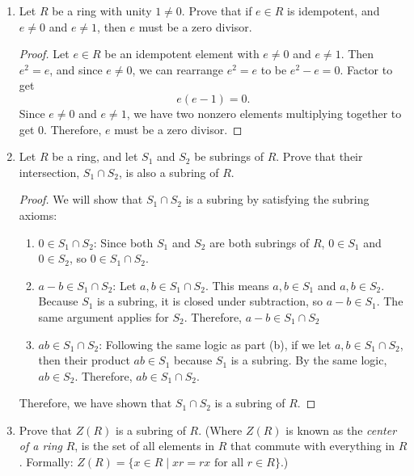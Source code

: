 \documentclass[12pt, oneside]{book}
\newcommand{\pf}[1]{
    \begin{customframedproof}[linecolor=orangehdx!75]
        \begin{proof}
        #1
        \end{proof}
    \end{customframedproof}
}
\begin{document}
\begin{enumerate}
{        \[
            u \cdot a \cdot a^{n - 1} = u \cdot 0.
        \]
        Since \(ua = 1\), we get \(1 \cdot a^{n - 1} = 0\), which means \(a^{n - 1} = 0\). But we said that \(n\) was the smallest such \(n\) such that \(a^{n} = 0\). This is a contradiction. Therefore, \(a\) cannot be a unit.    
    }
    \item Let \(R\) be a ring with unity \(1 \ne 0\). Prove that if \(e \in R\) is idempotent, and \(e \ne 0\) and \(e \ne 1\), then \(e\) must be a zero divisor. 
    \pf{
        Let \(e \in R\) be an idempotent element with \(e \ne 0\) and \(e \ne 1\). Then \(e^{2} = e\), and since \(e \ne 0\), we can rearrange \(e^{2} = e\) to be \(e^{2} - e = 0\). Factor to get
        \[
            e(e - 1) = 0.
        \]
        Since \(e \ne 0\) and \(e \ne 1\), we have two nonzero elements multiplying together to get 0. Therefore, \(e\) must be a zero divisor. 
    }
    \item Let \(R\) be a ring, and let \(S_{1}\) and \(S_{2}\) be subrings of \(R\). Prove that their intersection, \(S_{1} \cap S_{2}\), is also a subring of \(R\). 
    \pf{
        We will show that \(S_{1} \cap S_{2}\) is a subring by satisfying the subring axioms:
        \begin{enumerate}
            \item \(0 \in S_{1} \cap S_{2}\): Since both \(S_{1}\) and \(S_{2}\) are both subrings of \(R\), \(0 \in S_{1}\) and \(0 \in S_{2}\), so \(0 \in S_{1} \cap S_{2}\).
            \item \(a - b \in S_{1} \cap S_{2}\): Let \(a,b \in S_{1} \cap S_{2}\). This means \(a,b \in S_{1}\) and \(a,b \in S_{2}\). Because \(S_{1}\) is a subring, it is closed under subtraction, so \(a - b \in S_{1}\). The same argument applies for \(S_{2}\). Therefore, \(a - b \in S_{1} \cap S_{2}\)
            \item \(ab \in S_{1} \cap S_{2}\): Following the same logic as part (b), if we let \(a,b \in S_{1} \cap S_{2}\), then their product \(ab \in S_{1}\) because \(S_{1}\) is a subring. By the same logic, \(ab \in S_{2}\). Therefore, \(ab \in S_{1} \cap S_{2}\).
        \end{enumerate}
        Therefore, we have shown that \(S_{1} \cap S_{2}\) is a subring of \(R\). 
    }
    \item Prove that \(Z(R)\) is a subring of \(R\). (Where \(Z(R)\) is known as the \textit{center of a ring} \(R\), is the set of all elements in \(R\) that commute with everything in \(R\). Formally: \(Z(R) = \{x \in R \mid xr = rx \text{ for all } r \in R\}\).)

\end{enumerate}
\end{document}
